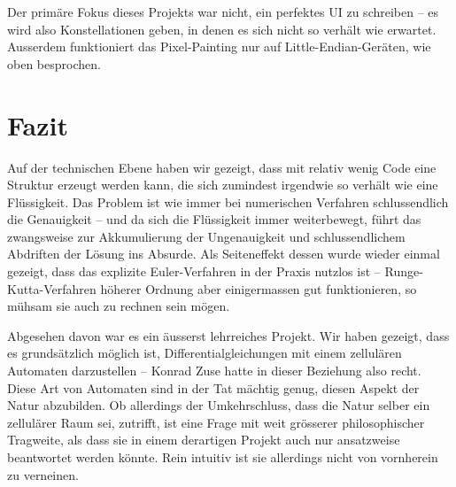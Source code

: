 \documentclass[11pt]{report} %
\theoremstyle{definition}
\begin{document}
Der primäre Fokus dieses Projekts war nicht, ein perfektes UI zu schreiben -- es wird also Konstellationen geben, in denen es sich nicht so verhält wie erwartet. Ausserdem funktioniert das Pixel-Painting nur auf Little-Endian-Geräten, wie oben besprochen.

\section{Fazit}

Auf der technischen Ebene haben wir gezeigt, dass mit relativ wenig Code eine Struktur erzeugt werden kann, die sich zumindest irgendwie so verhält wie eine Flüssigkeit. Das Problem ist wie immer bei numerischen Verfahren schlussendlich die Genauigkeit -- und da sich die Flüssigkeit immer weiterbewegt, führt das zwangsweise zur Akkumulierung der Ungenauigkeit und schlussendlichem Abdriften der Lösung ins Absurde. Als Seiteneffekt dessen wurde wieder einmal gezeigt, dass das explizite Euler-Verfahren in der Praxis nutzlos ist -- Runge-Kutta-Verfahren höherer Ordnung aber einigermassen gut funktionieren, so mühsam sie auch zu rechnen sein mögen.

Abgesehen davon war es ein äusserst lehrreiches Projekt. Wir haben gezeigt, dass es grundsätzlich möglich ist, Differentialgleichungen mit einem zellulären Automaten darzustellen -- Konrad Zuse hatte in dieser Beziehung also recht. Diese Art von Automaten sind in der Tat mächtig genug, diesen Aspekt der Natur abzubilden. Ob allerdings der Umkehrschluss, dass die Natur selber ein zellulärer Raum sei, zutrifft, ist eine Frage mit weit grösserer philosophischer Tragweite, als dass sie in einem derartigen Projekt auch nur ansatzweise beantwortet werden könnte. Rein intuitiv ist sie allerdings nicht von vornherein zu verneinen.



\end{document}
